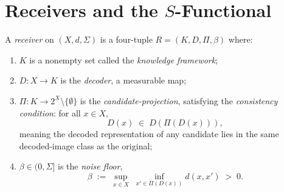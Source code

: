 \documentclass[twocolumn,11pt,a4paper]{article}
\begin{document}
\section{Receivers and the $S$-Functional}
\label{sec:receivers}

\begin{definition}[Receiver]
\label{def:receiver}
A \emph{receiver} on $(X,d,\Sigma)$ is a four-tuple
$R=(K,D,\Pi,\beta)$ where:
\begin{enumerate}[label=(\alph*),leftmargin=*]
  \item $K$ is a nonempty set called the \emph{knowledge framework};
  \item $D\colon X\to K$ is the \emph{decoder}, a measurable map;
  \item $\Pi\colon K\to 2^X\setminus\{\emptyset\}$ is the
    \emph{candidate-projection}, satisfying the \emph{consistency
    condition}: for all $x\in X$,
    \[
      D(x)\;\in\;D\!\left(\Pi(D(x))\right),
    \]
    meaning the decoded representation of any candidate lies in the
    same decoded-image class as the original;
  \item $\beta\in(0,\Sigma]$ is the \emph{noise floor},
    \[
      \beta\;:=\;\sup_{x\in X}\;\inf_{x'\in\Pi(D(x))} d(x,x')\;>\;0.
    \]
\end{enumerate}
\end{definition}
\end{document}
